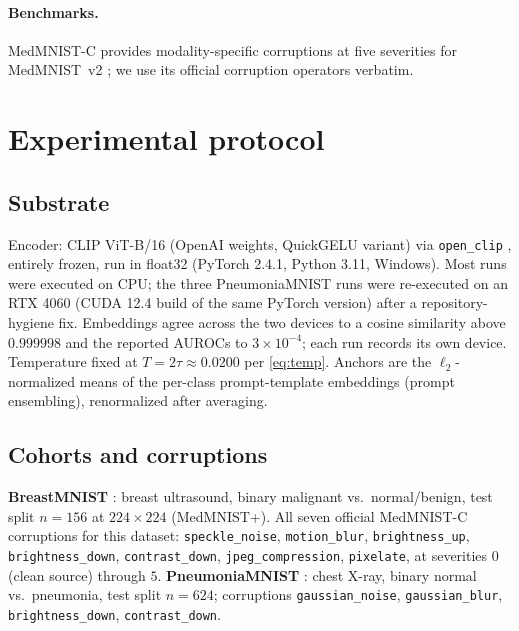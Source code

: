 \documentclass[11pt]{article}
\begin{document}
\paragraph{Benchmarks.} MedMNIST-C \citep{disalvo2025medmnistc} provides
modality-specific corruptions at five severities for MedMNIST~v2
\citep{yang2023medmnist}; we use its official corruption operators verbatim.

\section{Experimental protocol}
\label{sec:protocol}

\subsection{Substrate}

Encoder: CLIP ViT-B/16 (OpenAI weights, QuickGELU variant) via
\texttt{open\_clip} \citep{ilharco2021openclip}, entirely frozen, run in
float32 (PyTorch 2.4.1, Python 3.11, Windows). Most runs were executed on CPU;
the three PneumoniaMNIST runs were re-executed on an RTX 4060 (CUDA 12.4 build
of the same PyTorch version) after a repository-hygiene fix. Embeddings agree
across the two devices to a cosine similarity above $0.999998$ and the reported
AUROCs to $3\times10^{-4}$; each run records its own device. Temperature fixed at
$T = 2\tau \approx 0.0200$ per \eqref{eq:temp}. Anchors are the
$\ell_2$-normalized means of the per-class prompt-template embeddings
(prompt ensembling), renormalized after averaging.

\subsection{Cohorts and corruptions}

\textbf{BreastMNIST} \citep{yang2023medmnist,aldhabyani2020busi}: breast
ultrasound, binary malignant vs.\ normal/benign, test split $n=156$ at
$224\times224$ (MedMNIST+). All seven official MedMNIST-C corruptions for
this dataset: \texttt{speckle\_noise}, \texttt{motion\_blur},
\texttt{brightness\_up}, \texttt{brightness\_down}, \texttt{contrast\_down},
\texttt{jpeg\_compression}, \texttt{pixelate}, at severities $0$ (clean
source) through $5$.
\textbf{PneumoniaMNIST} \citep{kermany2018pneumonia}: chest X-ray, binary
normal vs.\ pneumonia, test split $n=624$; corruptions
\texttt{gaussian\_noise}, \texttt{gaussian\_blur}, \texttt{brightness\_down},
\texttt{contrast\_down}.
\end{document}

